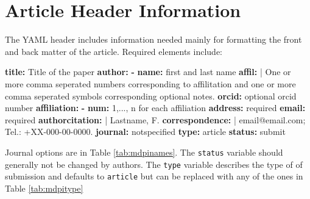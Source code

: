 \documentclass[notspecified,article,submit,moreauthors,pdftex]{Definitions/mdpi}
\newenvironment{Shaded}{\begin{snugshade}}{\end{snugshade}}
\newcommand{\AttributeTok}[1]{\textcolor[rgb]{0.13,0.29,0.53}{#1}}
\newcommand{\CharTok}[1]{\textcolor[rgb]{0.31,0.60,0.02}{#1}}
\newcommand{\FunctionTok}[1]{\textcolor[rgb]{0.13,0.29,0.53}{\textbf{#1}}}
\newcommand{\KeywordTok}[1]{\textcolor[rgb]{0.13,0.29,0.53}{\textbf{#1}}}
\newcommand{\NormalTok}[1]{#1}
\begin{document}

\hypertarget{article-header-information}{%
\section{Article Header Information}\label{article-header-information}}

The YAML header includes information needed mainly for formatting the
front and back matter of the article. Required elements include:

\begin{Shaded}
\begin{Highlighting}[]
\FunctionTok{title}\KeywordTok{:}\AttributeTok{ Title of the paper}
\FunctionTok{author}\KeywordTok{:}
\AttributeTok{  }\KeywordTok{{-}}\AttributeTok{ }\FunctionTok{name}\KeywordTok{:}\AttributeTok{ first and last name}
\FunctionTok{    affil}\KeywordTok{: }\CharTok{|}
\NormalTok{      One or more comma seperated numbers corresponding to affilitation}
\NormalTok{      and one or more  comma seperated symbols corresponding }
\NormalTok{      optional notes.}
\AttributeTok{    }\FunctionTok{orcid}\KeywordTok{:}\AttributeTok{ optional orcid number}
\FunctionTok{affiliation}\KeywordTok{:}\AttributeTok{  }
\AttributeTok{  }\KeywordTok{{-}}\AttributeTok{ }\FunctionTok{num}\KeywordTok{:}\AttributeTok{ 1,..., n for each affiliation}
\AttributeTok{    }\FunctionTok{address}\KeywordTok{:}\AttributeTok{ required}
\AttributeTok{    }\FunctionTok{email}\KeywordTok{:}\AttributeTok{ required}
\FunctionTok{authorcitation}\KeywordTok{: }\CharTok{|}
\NormalTok{  Lastname, F.}
\FunctionTok{correspondence}\KeywordTok{: }\CharTok{|}
\NormalTok{  email@email.com; Tel.: +XX{-}000{-}00{-}0000.}
\FunctionTok{journal}\KeywordTok{:}\AttributeTok{ notspecified}
\FunctionTok{type}\KeywordTok{:}\AttributeTok{ article}
\FunctionTok{status}\KeywordTok{:}\AttributeTok{ submit}
\end{Highlighting}
\end{Shaded}

Journal options are in Table \ref{tab:mdpinames}. The \texttt{status}
variable should generally not be changed by authors. The \texttt{type}
variable describes the type of of submission and defaults to
\texttt{article} but can be replaced with any of the ones in Table
\ref{tab:mdpitype}
\end{document}
